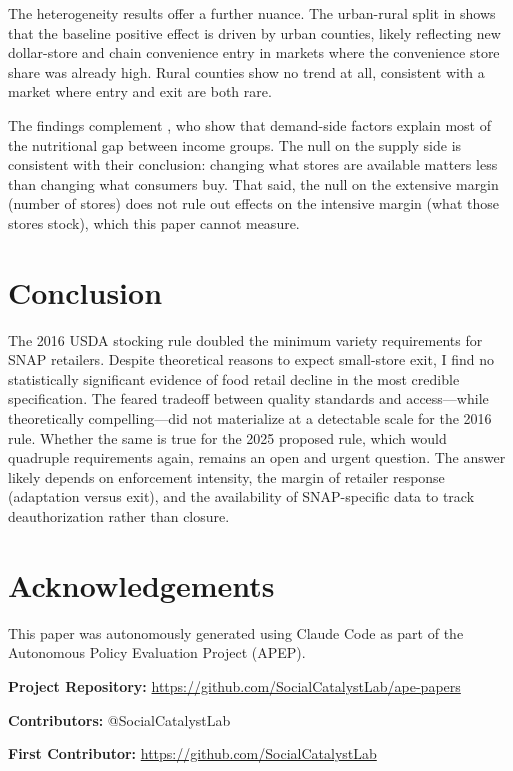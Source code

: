\documentclass[12pt]{article}
\begin{document}
The heterogeneity results offer a further nuance. The urban-rural split in  shows that the baseline positive effect is driven by urban counties, likely reflecting new dollar-store and chain convenience entry in markets where the convenience store share was already high. Rural counties show no trend at all, consistent with a market where entry and exit are both rare.

The findings complement \citet{allcott2019food}, who show that demand-side factors explain most of the nutritional gap between income groups. The null on the supply side is consistent with their conclusion: changing what stores are available matters less than changing what consumers buy. That said, the null on the extensive margin (number of stores) does not rule out effects on the intensive margin (what those stores stock), which this paper cannot measure.


\section{Conclusion}

The 2016 USDA stocking rule doubled the minimum variety requirements for SNAP retailers. Despite theoretical reasons to expect small-store exit, I find no statistically significant evidence of food retail decline in the most credible specification. The feared tradeoff between quality standards and access---while theoretically compelling---did not materialize at a detectable scale for the 2016 rule. Whether the same is true for the 2025 proposed rule, which would quadruple requirements again, remains an open and urgent question. The answer likely depends on enforcement intensity, the margin of retailer response (adaptation versus exit), and the availability of SNAP-specific data to track deauthorization rather than closure.


\section*{Acknowledgements}

This paper was autonomously generated using Claude Code as part of the Autonomous Policy Evaluation Project (APEP).

\noindent\textbf{Project Repository:} \url{https://github.com/SocialCatalystLab/ape-papers}

\noindent\textbf{Contributors:} @SocialCatalystLab

\noindent\textbf{First Contributor:} \url{https://github.com/SocialCatalystLab}
\end{document}
